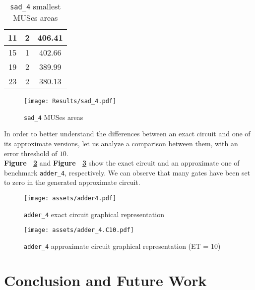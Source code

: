 \documentclass[]{usiinfbachelorproject}
\begin{document}
\begin{itemize}
\begin{table}[H]
\begin{tabular}{c|c|c}
                \hline
                11 & 2 & 406.41 \\
                \hline
                15 & 1 & 402.66 \\
                \hline
                19 & 2 & 389.99 \\
                \hline
                23 & 2 & 380.13   
            \end{tabular}
            \caption{\texttt{sad\_4} smallest MUSes areas}
            \label{tab:r11}
        \end{table}
        \begin{figure}[H]
            \centering
            \texttt{[image: Results/sad\_4.pdf]}
            \caption{\texttt{sad\_4} MUSes areas}
            \label{fig:r11}
        \end{figure}
\end{itemize}
\newpage
\noindent
In order to better understand the differences between an exact circuit and one of its approximate versions, let us analyze a comparison between them, with an error threshold of $10$. \\
\textbf{Figure ~\ref{fig:exact}} and \textbf{Figure ~\ref{fig:approximate}} show the exact circuit and an approximate one of benchmark \texttt{adder\_4}, respectively. We can observe that many gates have been set to zero in the generated approximate circuit.
\begin{figure}[H]
    \centering
    \texttt{[image: assets/adder4.pdf]}
    \caption{\texttt{adder\_4} exact circuit graphical representation}
    \label{fig:exact}
\end{figure}
\begin{figure}[H]
    \centering
    \texttt{[image: assets/adder\_4.C10.pdf]}
    \caption{\texttt{adder\_4} approximate circuit graphical representation (ET = 10)}
    \label{fig:approximate}
\end{figure}

\newpage

\section{Conclusion and Future Work}\label{sec:conclusions}
\end{document}
